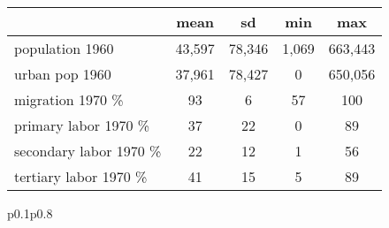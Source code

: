 {
\begin{tabular}{lcccc}}{p{0.1\textwidth}p{0.8\textwidth}}
                    &        mean&          sd&         min&         max\\
\hline
population 1960     &      43,597&      78,346&       1,069&     663,443\\
urban pop 1960      &      37,961&      78,427&           0&     650,056\\
migration 1970 \%   &          93&           6&          57&         100\\
primary labor 1970 \%&          37&          22&           0&          89\\
secondary labor 1970 \%&          22&          12&           1&          56\\
tertiary labor 1970 \%&          41&          15&           5&          89\\
\end{tabular}{p{0.1\textwidth}p{0.8\textwidth}}
}
